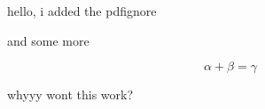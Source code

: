 \documentclass{article}
\begin{document}
hello, i added the pdfignore

and some more

$$\alpha + \beta = \gamma$$


whyyy wont this work?
\end{document}
